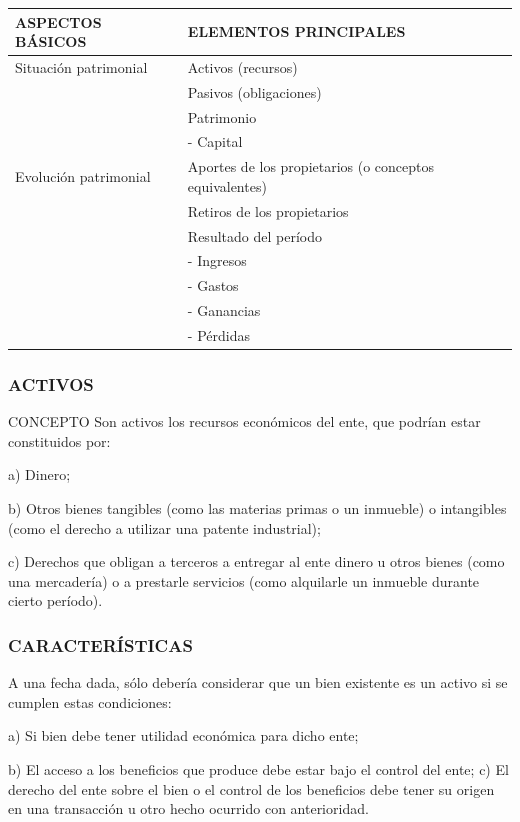 \begin{center}
\small
\begin{tabular}{|p{}|p{}|}
\hline
ASPECTOS BÁSICOS & ELEMENTOS PRINCIPALES \\ \hline
Situación patrimonial & Activos (recursos) \\ \hline
 & Pasivos (obligaciones) \\ \hline
 & Patrimonio \\ \hline
 & - Capital \\ \hline
Evolución patrimonial & Aportes de los propietarios (o conceptos equivalentes) \\ \hline
 & Retiros de los propietarios \\ \hline
 & Resultado del período \\ \hline
 & - Ingresos \\ \hline
 & - Gastos \\ \hline
 & - Ganancias \\ \hline
 & - Pérdidas \\ \hline
\end{tabular}
\end{center}

\subsubsection*{ACTIVOS}
CONCEPTO Son activos los recursos económicos del ente, que podrían estar constituidos por:

a) Dinero;

b) Otros bienes tangibles (como las materias primas o un inmueble) o intangibles (como el derecho a utilizar una patente industrial);

c) Derechos que obligan a terceros a entregar al ente dinero u otros bienes (como una mercadería) o a prestarle servicios (como alquilarle un inmueble durante cierto período).



\subsubsection*{CARACTERÍSTICAS}
A una fecha dada, sólo debería considerar que un bien existente es un activo si se cumplen estas condiciones:

a) Si bien debe tener utilidad económica para dicho ente;

b) El acceso a los beneficios que produce debe estar bajo el control del ente; c) El derecho del ente sobre el bien o el control de los beneficios debe tener su origen en una transacción u otro hecho ocurrido con anterioridad.

